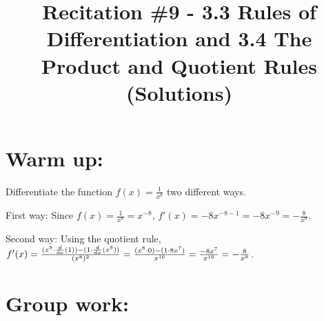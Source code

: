 \documentclass[nooutcomes]{ximera}
\title{Recitation \#9 - 3.3 Rules of Differentiation and 3.4 The Product and Quotient Rules (Solutions)}
\begin{document}
\begin{abstract}		\end{abstract}
\maketitle

\section*{Warm up:} 
Differentiate the function $f(x) = \frac{1}{x^8}$ two different ways.

	\begin{freeResponse}
	First way:  Since $f(x) = \frac{1}{x^8} = x^{-8}$, $f'(x) = -8x^{-8-1} = -8x^{-9} = -\frac{8}{x^9}$.
	
	Second way:  Using the quotient rule, 
	$f'(x) = \frac{(x^8 \cdot \frac{d}{dx}(1)) - (1 \cdot \frac{d}{dx}(x^8))}{(x^8)^2}
	= \frac{(x^8 \cdot 0) - (1 \cdot 8x^7)}{x^{16}}
	= \frac{-8x^7}{x^{16}}
	= - \frac{8}{x^9}$.
	\end{freeResponse}	
	
	
	
	
	

\section*{Group work:}
\end{document}
